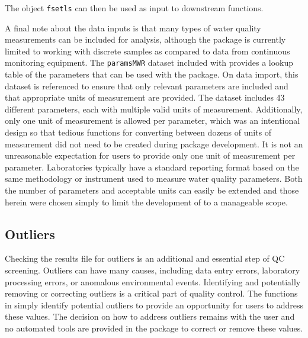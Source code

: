 The object \texttt{fsetls} can then be used as input to downstream functions.

A final note about the data inputs is that many types of water quality measurements can be included for analysis, although the package is currently limited to working with discrete samples as compared to data from continuous monitoring equipment. The \texttt{paramsMWR} dataset included with  provides a lookup table of the parameters that can be used with the package. On data import, this dataset is referenced to ensure that only relevant parameters are included and that appropriate units of measurement are provided. The dataset includes 43 different parameters, each with multiple valid units of measurement. Additionally, only one unit of measurement is allowed per parameter, which was an intentional design so that tedious functions for converting between dozens of units of measurement did not need to be created during package development. It is not an unreasonable expectation for users to provide only one unit of measurement per parameter. Laboratories typically have a standard reporting format based on the same methodology or instrument used to measure water quality parameters. Both the number of parameters and acceptable units can easily be extended and those herein were chosen simply to limit the development of  to a manageable scope.

\hypertarget{outliers}{%
\subsection{Outliers}\label{outliers}}

Checking the results file for outliers is an additional and essential step of QC screening. Outliers can have many causes, including data entry errors, laboratory processing errors, or anomalous environmental events. Identifying and potentially removing or correcting outliers is a critical part of quality control. The functions in  simply identify potential outliers to provide an opportunity for users to address these values. The decision on how to address outliers remains with the user and no automated tools are provided in the package to correct or remove these values.

